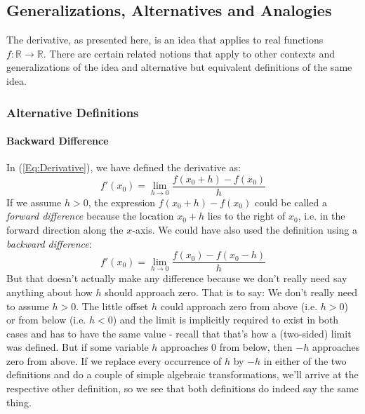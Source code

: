 \subsection{Generalizations, Alternatives and Analogies}
The derivative, as presented here, is an idea that applies to real functions $f: \mathbb{R} \rightarrow \mathbb{R}$. There are certain related notions that apply to other contexts and generalizations of the idea and alternative but equivalent definitions of the same idea.

\subsubsection{Alternative Definitions}



\paragraph{Backward Difference}
In (\ref{Eq:Derivative}), we have defined the derivative as:
\begin{equation}
 f'(x_0) = \lim_{h \rightarrow 0} \frac{f(x_0 + h) - f(x_0)}{h}
\end{equation}
If we assume $h > 0$, the expression $f(x_0 + h) - f(x_0)$ could be called a \emph{forward difference} because the location $x_0 + h$ lies to the right of $x_0$, i.e. in the forward direction along the $x$-axis. We could have also used the definition using a \emph{backward difference}:
\begin{equation}
 f'(x_0) = \lim_{h \rightarrow 0} \frac{f(x_0) - f(x_0-h)}{h}
\end{equation}
But that doesn't actually make any difference because we don't really need say anything about how $h$ should approach zero. That is to say: We don't really need to assume $h > 0$. The little offset $h$ could approach zero from above (i.e. $h > 0$) or from below (i.e. $h < 0$) and the limit is implicitly required to exist in both cases and has to have the same value - recall that that's how a (two-sided) limit was defined. But if some variable $h$ approaches $0$ from below, then $-h$ approaches zero from above. If we replace every occurrence of $h$ by $-h$ in either of the two definitions and do a couple of simple algebraic transformations, we'll arrive at the respective other definition, so we see that both definitions do indeed say the same thing.

